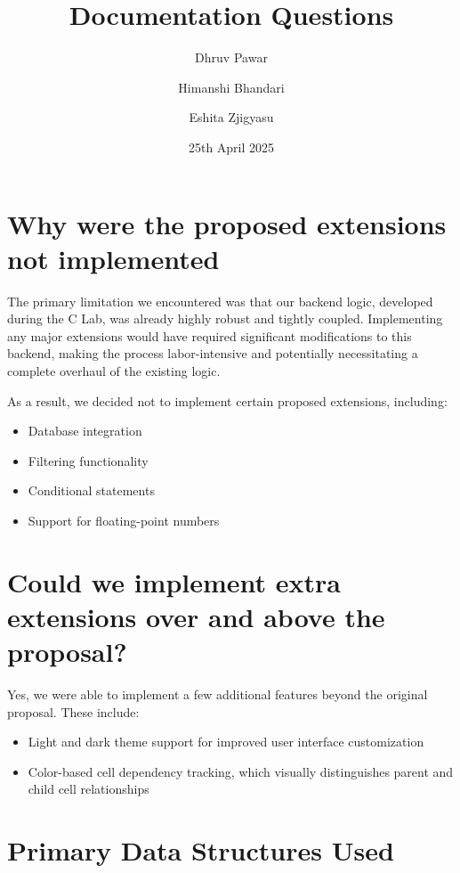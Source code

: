 \documentclass{article}
\title{Documentation Questions}
\author{Dhruv Pawar \and Himanshi Bhandari \and Eshita Zjigyasu}
\date{25th April 2025}
\begin{document}
\maketitle

\section*{Why were the proposed extensions not implemented}

The primary limitation we encountered was that our backend logic, developed during the C Lab, was already highly robust and tightly coupled. Implementing any major extensions would have required significant modifications to this backend, making the process labor-intensive and potentially necessitating a complete overhaul of the existing logic.

As a result, we decided not to implement certain proposed extensions, including:
\begin{itemize}
    \item Database integration
    \item Filtering functionality
    \item Conditional statements
    \item Support for floating-point numbers
\end{itemize}

\section*{Could we implement extra extensions over and above the proposal?}

Yes, we were able to implement a few additional features beyond the original proposal. These include:

\begin{itemize}
    \item Light and dark theme support for improved user interface customization
    \item Color-based cell dependency tracking, which visually distinguishes parent and child cell relationships
\end{itemize}

\section*{Primary Data Structures Used}
\end{document}
